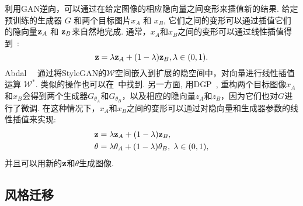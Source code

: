 利用GAN逆向，可以通过在给定图像的相应隐向量之间变形来插值新的结果.
给定预训练的生成器 $G$ 和两个目标图片$x_{A}$ 和 $x_{B}$, 它们之间的变形可以通过插值它们的隐向量$\mathbf{z}_{A}$ 和 $\mathbf{z}_{B}$来自然地完成. 
通常，$x_{A}$和$x_{B}$之间的变形可以通过线性插值得到~\cite{xia2020gaze,pan2020exploiting}: 
\begin{equation}
\z=\lambda \z_{A}+(1-\lambda) \z_{B}, \lambda \in(0,1).
\label{eqn:interp}
\end{equation}
Abdal~\etal~\cite{abdal2019image2stylegan} 通过将StyleGAN的$\mathcal{W}$空间嵌入到扩展的隐空间中，对向量进行线性插值运算 $\mathcal{W^{*}}$.
类似的操作也可以在~\cite{nitzan2020harness}中找到.
另一方面, 用DGP~\cite{pan2020exploiting}, 重构两个目标图像$x_{A}$和$x_{B}$会得到两个生成器$G_{\theta_{A}}$和$G_{\theta_{B}}$，以及相应的隐向量$ z_{A}$和$ z_{B}$，因为它们也对$G$进行了微调. 
在这种情况下，$x_{A}$和$x_{B}$之间的变形可以通过对隐向量和生成器参数的线性插值来实现: 
\begin{equation}
\begin{aligned}
\z&=\lambda \z_{A}+(1-\lambda) \z_{B},\\ \theta&=\lambda \theta_{A}+(1-\lambda) \theta_{B}, \; \lambda \in(0,1),
\end{aligned}
\label{eqn:interp_dgp}
\end{equation}
并且可以用新的$\mathbf{z}$和$\theta$生成图像.

\subsection{风格迁移}
\label{sec:style_tranfer}

